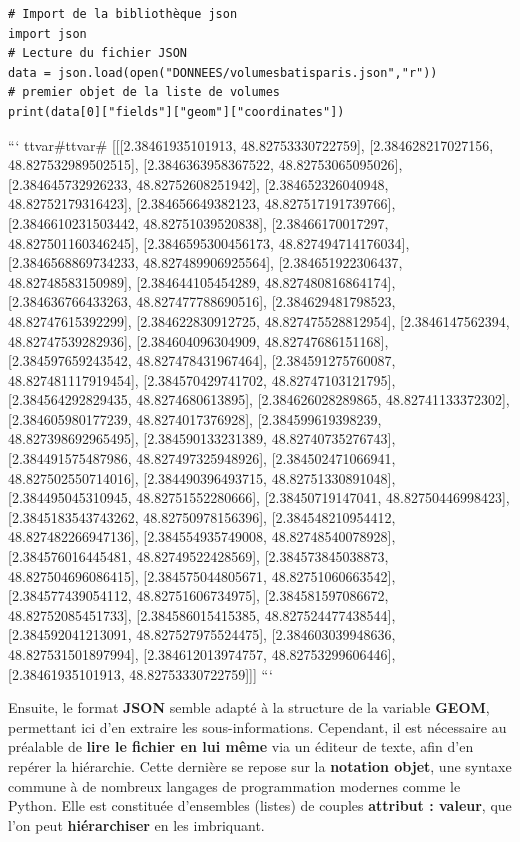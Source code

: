 \documentclass[
  11pt,
  french,
]{article}
\begin{document}
\begin{tcolorbox}[title= Chargement du jeu de données sous un format hiérarchisé dans Python ,colback=boitecode]
\begin{lstlisting}[style=code]
# Import de la bibliothèque json
import json
# Lecture du fichier JSON
data = json.load(open("DONNEES/volumesbatisparis.json","r"))
# premier objet de la liste de volumes
print(data[0]["fields"]["geom"]["coordinates"])\end{lstlisting}

```
ttvar{#}ttvar{#} [[[2.38461935101913, 48.82753330722759], [2.384628217027156, 48.827532989502515], [2.3846363958367522, 48.82753065095026], [2.384645732926233, 48.82752608251942], [2.384652326040948, 48.82752179316423], [2.384656649382123, 48.827517191739766], [2.3846610231503442, 48.82751039520838], [2.38466170017297, 48.827501160346245], [2.3846595300456173, 48.827494714176034], [2.3846568869734233, 48.827489906925564], [2.384651922306437, 48.82748583150989], [2.384644105454289, 48.827480816864174], [2.384636766433263, 48.827477788690516], [2.384629481798523, 48.82747615392299], [2.384622830912725, 48.827475528812954], [2.3846147562394, 48.82747539282936], [2.384604096304909, 48.82747686151168], [2.384597659243542, 48.827478431967464], [2.384591275760087, 48.827481117919454], [2.384570429741702, 48.82747103121795], [2.384564292829435, 48.8274680613895], [2.384626028289865, 48.82741133372302], [2.384605980177239, 48.8274017376928], [2.384599619398239, 48.827398692965495], [2.384590133231389, 48.82740735276743], [2.384491575487986, 48.827497325948926], [2.384502471066941, 48.827502550714016], [2.384490396493715, 48.82751330891048], [2.384495045310945, 48.82751552280666], [2.38450719147041, 48.82750446998423], [2.3845183543743262, 48.82750978156396], [2.384548210954412, 48.827482266947136], [2.384554935749008, 48.82748540078928], [2.384576016445481, 48.82749522428569], [2.384573845038873, 48.827504696086415], [2.384575044805671, 48.82751060663542], [2.384577439054112, 48.82751606734975], [2.384581597086672, 48.82752085451733], [2.384586015415385, 48.827524477438544], [2.384592041213091, 48.827527975524475], [2.384603039948636, 48.827531501897994], [2.384612013974757, 48.82753299606446], [2.38461935101913, 48.82753330722759]]]
```

\end{tcolorbox}

Ensuite, le format \textbf{JSON} semble adapté à la structure de la
variable \textbf{GEOM}, permettant ici d'en extraire les
sous-informations. Cependant, il est nécessaire au préalable de
\textbf{lire le fichier en lui même} via un éditeur de texte, afin d'en
repérer la hiérarchie. Cette dernière se repose sur la \textbf{notation
objet}, une syntaxe commune à de nombreux langages de programmation
modernes comme le Python. Elle est constituée d'ensembles (listes) de
couples \textbf{attribut : valeur}, que l'on peut \textbf{hiérarchiser}
en les imbriquant.\\
~\\
\end{document}
